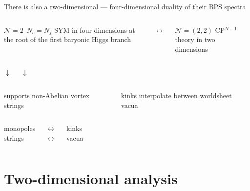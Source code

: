 \documentclass{beamer}
\begin{document}
\begin{frame}{}

	There is also a two-dimensional --- four-dimensional duality of their BPS spectra

\vspace{7mm}
\begin{columns}[t]
	\column{5cm}
	$ \mathcal{N}=2 $\,  $ N_c = N_f $ SYM 
	in four dimensions at the root
	of the first baryonic Higgs branch

	\column{0.5cm}
	\vspace{2mm}
	$ \longleftrightarrow $

	\column{5cm}
	$ \mathcal{N}=(2,2) $ CP$^{N-1}$ theory
	in two dimensions
\end{columns}

\vspace{5mm}
\begin{columns}[t]
	\column{5.0cm}
		\centering
		$ \downarrow $

	\column{0.5cm}

	\column{5.0cm}
		\centering
		$ \downarrow $
\end{columns}

\vspace{5mm}
\begin{columns}[t]
	\column{5cm}
	supports non-Abelian
	vortex strings

	\column{0.5cm}

	\column{5cm}
	kinks interpolate
	between worldsheet vacua
\end{columns}

\vspace{7mm}
\begin{columns}[t]
	\column{5cm}
	\centering
	monopoles\\[7mm]
	strings

	\column{0.5cm}
	$ \longleftrightarrow $\\[7mm]
	$ \longleftrightarrow $
	
	\column{5cm}
	\centering
	kinks\\[7mm]
	vacua
\end{columns}


\end{frame}


\section{Two-dimensional analysis}
\end{document}
